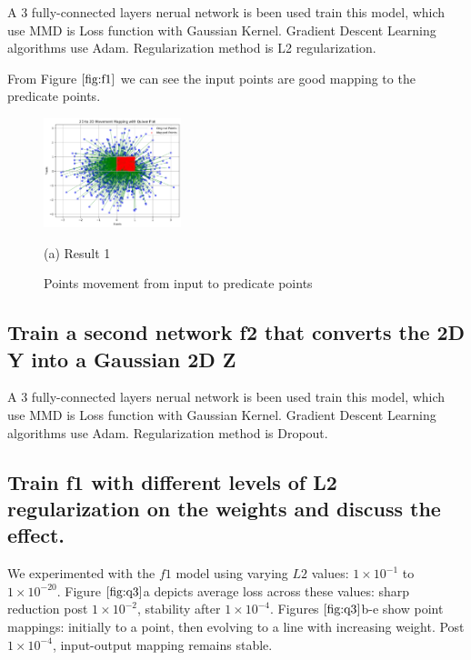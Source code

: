 \documentclass{article}
\begin{document}
A 3 fully-connected layers nerual network is been used train this model, 
which use MMD is Loss function with Gaussian Kernel. 
Gradient Descent Learning algorithms use Adam.
Regularization method is L2 regularization.

From Figure $\ref{fig:f1}$ we can see the input points are good mapping to the predicate points.

\begin{figure}[htb]

  \begin{minipage}[b]{1.0\linewidth}
    \centering
    \centerline{\includegraphics[width=4.0cm]{images/f1}}
    \centerline{(a) Result 1}\medskip
  \end{minipage}
  \caption{Points movement from input to predicate points}
  \label{fig:f1}
  \end{figure}

\subsection{Train a second network f2 that converts the 2D Y into a Gaussian 2D Z}
\label{ssec:q2}

A 3 fully-connected layers nerual network is been used train this model, 
which use MMD is Loss function with Gaussian Kernel. 
Gradient Descent Learning algorithms use Adam.
Regularization method is Dropout.

\subsection{Train f1 with different levels of L2 regularization on the weights and discuss the effect.}
\label{ssec:q3}

We experimented with the $f1$ model using varying $L2$ values: $
1\times 10^{-1}$ to $1\times 10^{-20}$. 
Figure $\ref{fig:q3}$a depicts average loss across these values: 
sharp reduction post $1\times 10^{-2}$, 
stability after $1\times 10^{-4}$. 
Figures $\ref{fig:q3}$b-e show point mappings: 
initially to a point, then evolving to a line with 
increasing weight. Post $1\times 10^{-4}$, 
input-output mapping remains stable.
\end{document}

